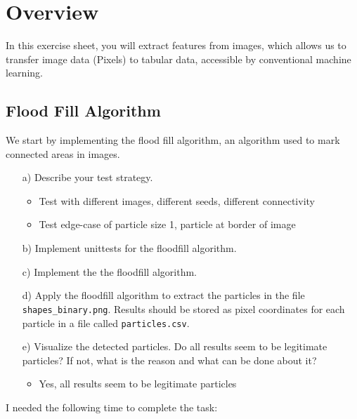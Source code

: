 \documentclass{article}
\begin{document}
\thispagestyle{page1} 

\section{Overview}

In this exercise sheet, you will extract features from images, which allows us to transfer image data (Pixels) to tabular data, accessible by conventional machine learning.

\subsection{Flood Fill Algorithm}

We start by implementing the flood fill algorithm, an algorithm used to mark connected areas in images. 

\begin{enumerate}

\item[a)] Describe your test strategy.
\begin{itemize}
    \item Test with different images, different seeds, different connectivity
    \item Test edge-case of particle size 1, particle at border of image
\end{itemize}

\item[b)] Implement unittests for the floodfill algorithm.

\item[c)] Implement the the floodfill algorithm.

\item[d)] Apply the floodfill algorithm to extract the particles in the file \texttt{shapes\_binary.png}. Results should be stored as pixel coordinates for each particle in a file called \texttt{particles.csv}.

\item[e)] Visualize the detected particles. Do all results seem to be legitimate particles? If not, what is the reason and what can be done about it?
\begin{itemize}
    \item Yes, all results seem to be legitimate particles
\end{itemize}

\end{enumerate}

I needed the following time to complete the task:
\end{document}
